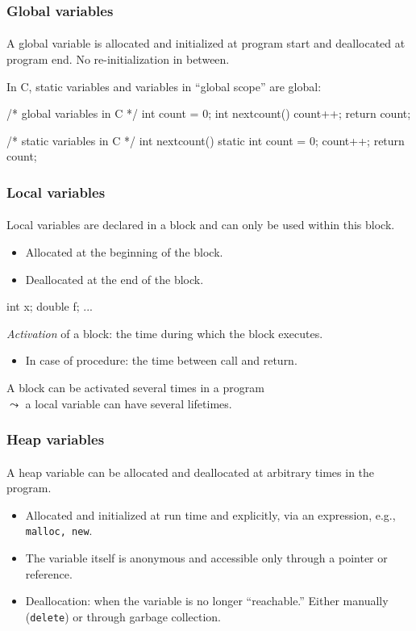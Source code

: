 \documentclass{beamer}
\begin{document}
\begin{frame}[fragile]
\frametitle{Global variables}
\framesubtitle{}
A global variable is allocated and initialized at program start and deallocated
at program end. No re-initialization in between.

\bigskip
In C, static variables and variables in ``global scope''  are global:
\begin{cplus3}
/* global variables in C */
int count = 0;
int nextcount() {
    count++;
    return count;
}

/* static variables in C */
int nextcount() {
    static int count = 0;
    count++;
    return count;
}
\end{cplus3}
\end{frame}


\begin{frame}[fragile]
\frametitle{Local variables}
\framesubtitle{}
Local variables are declared in a block and can only be used within
this block.

\begin{itemize}
\item Allocated at the beginning of the block.
\item Deallocated at the end of the block.
\end{itemize}

\begin{cplus3}
{ 
 int x;
 double f;
 ...
}
\end{cplus3}

\bigskip

\textit{Activation} of a block: the time during which the block executes.
\begin{itemize}
\item In case of procedure: the time between call and return.
\end{itemize}
A block can be activated several times in a program\\
\hfill $\leadsto$ a local variable can have several lifetimes.  
\end{frame}

\begin{frame}[fragile]
\frametitle{Heap variables}
\framesubtitle{}
A heap variable can be allocated and deallocated at arbitrary times in
the program.
\begin{itemize}
\item Allocated and initialized at run time and explicitly, 
via an expression, e.g., \texttt{malloc, new}.
\item The variable itself is anonymous and accessible only through 
 a pointer or reference. 
\item Deallocation: when the variable is no longer ``reachable.''
Either manually (\texttt{delete}) or through garbage collection. 
\end{itemize}
\end{frame}
\end{document}
